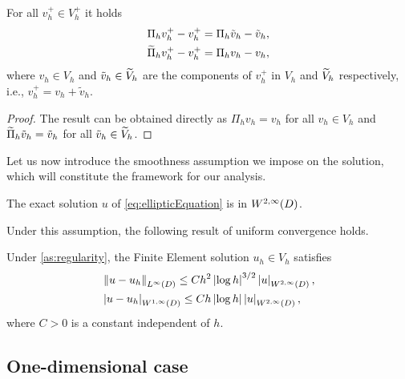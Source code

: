 \documentclass[10pt]{article}
\begin{document}
\begin{lemma}\label{lem:InterpSum} For all $v_h^+ \in V_h^+$ it holds
	\begin{equation}
	\begin{aligned}
		\Pi_h v_h^+ - v_h^+ &= \Pi_h \tilde v_h - \tilde v_h,  \\
		\widetilde \Pi_h v^+_h - v_h^+ &= \Pi_h v_h - v_h,
	\end{aligned}
	\end{equation} 
	where $v_h \in V_h$ and $\tilde v_h \in \widetilde V_h$ are the components of $v_h^+$ in $V_h$ and $\widetilde V_h$ respectively, i.e., $v_h^+ = v_h + \tilde v_h$.
\end{lemma}
\begin{proof} The result can be obtained directly as $\Pi_h v_h = v_h$ for all $v_h \in V_h$ and $\widetilde \Pi_h \tilde v_h = \tilde v_h$ for all $\tilde v_h \in \widetilde V_h$.
\end{proof}

Let us now introduce the smoothness assumption we impose on the solution, which will constitute the framework for our analysis. 

\begin{assumption}\label{as:regularity} The exact solution $u$ of \eqref{eq:ellipticEquation} is in $W^{2, \infty}(D)$.
\end{assumption}

Under this assumption, the following result of uniform convergence holds.

\begin{theorem}\label{thm:CiarletUniform} Under \cref{as:regularity}, the Finite Element solution $u_h \in V_h$ satisfies
	\begin{equation}\label{eq:W1InfErr}
	\begin{aligned}
		&\left\|u - u_h\right\|_{L^\infty(D)} \leq C h^2 \left\lvert\log h\right\rvert^{3/2} \left\lvert u\right\rvert_{W^{2, \infty}(D)}, \\
		&\left\lvert u - u_h\right\rvert_{W^{1, \infty}(D)} \leq C h \left\lvert\log h\right\rvert \left\lvert u\right\rvert_{W^{2, \infty}(D)},
	\end{aligned}
	\end{equation}
	where $C > 0$ is a constant independent of $h$.
\end{theorem}

\subsection{One-dimensional case}
\end{document}
